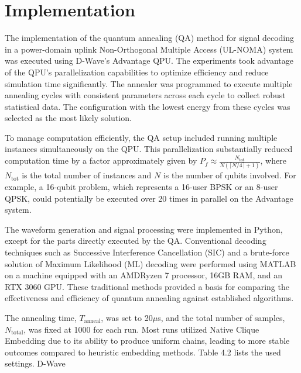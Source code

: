 \section{Implementation}

The implementation of the quantum annealing (QA) method for signal decoding in a power-domain uplink Non-Orthogonal Multiple Access (UL-NOMA) system was executed using D-Wave’s Advantage QPU. The experiments took advantage of the QPU's parallelization capabilities to optimize efficiency and reduce simulation time significantly. The annealer was programmed to execute multiple annealing cycles with consistent parameters across each cycle to collect robust statistical data. The configuration with the lowest energy from these cycles was selected as the most likely solution.

To manage computation efficiently, the QA setup included running multiple instances simultaneously on the QPU. This parallelization substantially reduced computation time by a factor approximately given by \(P_f \approx \frac{N_{\text{tot}}}{N (\lceil N/4 \rceil + 1)}\), where \(N_{\text{tot}}\) is the total number of instances and \(N\) is the number of qubits involved\cite{Kim2019}. For example, a 16-qubit problem, which represents a 16-user BPSK or an 8-user QPSK, could potentially be executed over 20 times in parallel on the Advantage system.

The waveform generation and signal processing were implemented in Python, except for the parts directly executed by the QA. Conventional decoding techniques such as Successive Interference Cancellation (SIC) and a brute-force solution of Maximum Likelihood (ML) decoding were performed using MATLAB on a machine equipped with an AMD\texttrademark Ryzen 7 processor, 16GB RAM, and an RTX 3060 GPU. These traditional methods provided a basis for comparing the effectiveness and efficiency of quantum annealing against established algorithms.

The annealing time, \(T_{\text{anneal}}\), was set to 20$\mu$s, and the total number of samples, \(N_{\text{total}}\), was fixed at 1000 for each run. Most runs utilized Native Clique Embedding due to its ability to produce uniform chains, leading to more stable outcomes compared to heuristic embedding methods. Table 4.2 lists the used settings. D-Wave 


